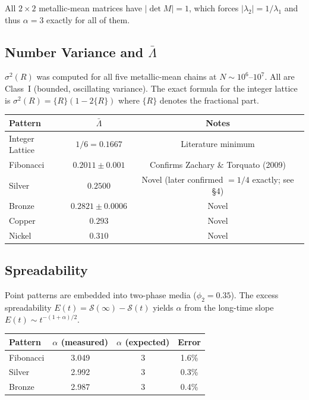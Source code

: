 \documentclass[11pt,letterpaper]{article}
\begin{document}
\vspace{0.3em}\noindent All $2\times2$ metallic-mean matrices have $|\det M|=1$,
which forces $|\lambda_2|=1/\lambda_1$ and thus $\alpha=3$ exactly for all of them.

\subsection{Number Variance and $\bar\Lambda$}

$\sigma^2(R)$ was computed for all five metallic-mean chains at $N \sim 10^6$--$10^7$.
All are Class~I (bounded, oscillating variance). The exact formula for the integer
lattice is $\sigma^2(R) = \{R\}(1-2\{R\})$ where $\{R\}$ denotes the fractional part.

\noindent\begin{tabular}{lcc}
\toprule
\textbf{Pattern} & $\bar\Lambda$ & \textbf{Notes} \\
\midrule
Integer Lattice & $1/6 = 0.1667$ & Literature minimum \\
Fibonacci       & $0.2011 \pm 0.001$ & Confirms Zachary \& Torquato (2009) \\
Silver          & $0.2500$ & Novel (later confirmed $= 1/4$ exactly; see §4) \\
Bronze          & $0.2821 \pm 0.0006$ & Novel \\
Copper          & $0.293$ & Novel \\
Nickel          & $0.310$ & Novel \\
\bottomrule
\end{tabular}

\subsection{Spreadability}

Point patterns are embedded into two-phase media ($\phi_2 = 0.35$). The excess
spreadability $E(t) = \mathcal{S}(\infty) - \mathcal{S}(t)$ yields $\alpha$ from
the long-time slope $E(t) \sim t^{-(1+\alpha)/2}$.

\noindent\begin{tabular}{lccc}
\toprule
\textbf{Pattern} & $\alpha$ (measured) & $\alpha$ (expected) & Error \\
\midrule
Fibonacci & 3.049 & 3 & 1.6\% \\
Silver    & 2.992 & 3 & 0.3\% \\
Bronze    & 2.987 & 3 & 0.4\% \\
\bottomrule
\end{tabular}
\end{document}
